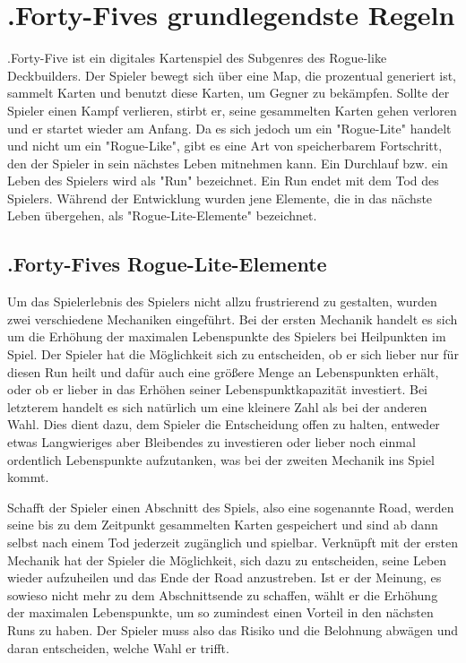 
\section{.Forty-Fives grundlegendste Regeln}\label{sec:grundlegenste-regeln}

\renewcommand{\kapitelautor}{Autor: Irgendwer} %

%
.Forty-Five ist ein digitales Kartenspiel des Subgenres des Rogue-like Deckbuilders. %
Der Spieler bewegt sich über eine Map, die prozentual generiert ist, sammelt Karten und benutzt diese Karten,
um Gegner zu bekämpfen. Sollte der Spieler einen Kampf verlieren, stirbt er, seine gesammelten Karten
gehen verloren und er startet wieder am Anfang. Da es sich jedoch um ein "Rogue-Lite" handelt und nicht um ein "Rogue-Like",
gibt es eine Art von speicherbarem Fortschritt, den der Spieler in sein nächstes Leben mitnehmen kann.
Ein Durchlauf bzw. ein Leben des Spielers wird als "Run" bezeichnet. Ein Run endet mit dem Tod des Spielers.
Während der Entwicklung wurden jene Elemente, die in das nächste Leben übergehen, als "Rogue-Lite-Elemente" bezeichnet.


\subsection{.Forty-Fives Rogue-Lite-Elemente}\label{rogue_lite_elemente}

Um das Spielerlebnis des Spielers nicht allzu frustrierend zu gestalten, wurden zwei verschiedene Mechaniken eingeführt.
Bei der ersten Mechanik handelt es sich um die Erhöhung der maximalen Lebenspunkte des Spielers bei Heilpunkten im Spiel. Der Spieler hat die Möglichkeit
sich zu entscheiden, ob er sich lieber nur für diesen Run heilt und dafür auch eine größere Menge an Lebenspunkten erhält, oder ob er
lieber in das Erhöhen seiner Lebenspunktkapazität investiert. Bei letzterem handelt es sich natürlich um eine kleinere Zahl als bei der anderen Wahl.
Dies dient dazu, dem Spieler die Entscheidung offen zu halten, entweder etwas Langwieriges aber Bleibendes zu investieren oder lieber noch einmal ordentlich
Lebenspunkte aufzutanken, was bei der zweiten Mechanik ins Spiel kommt. %

Schafft der Spieler einen Abschnitt des Spiels, also eine sogenannte Road, werden seine bis zu dem Zeitpunkt gesammelten Karten
gespeichert und sind ab dann selbst nach einem Tod jederzeit zugänglich und spielbar. Verknüpft mit der ersten Mechanik
hat der Spieler die Möglichkeit, sich dazu zu entscheiden, seine Leben wieder aufzuheilen und das Ende der Road anzustreben.
Ist er der Meinung, es sowieso nicht mehr zu dem Abschnittsende zu schaffen, wählt er die Erhöhung der maximalen
Lebenspunkte, um so zumindest einen Vorteil in den nächsten Runs zu haben. Der Spieler muss also das Risiko und die
Belohnung abwägen und daran entscheiden, welche Wahl er trifft.

